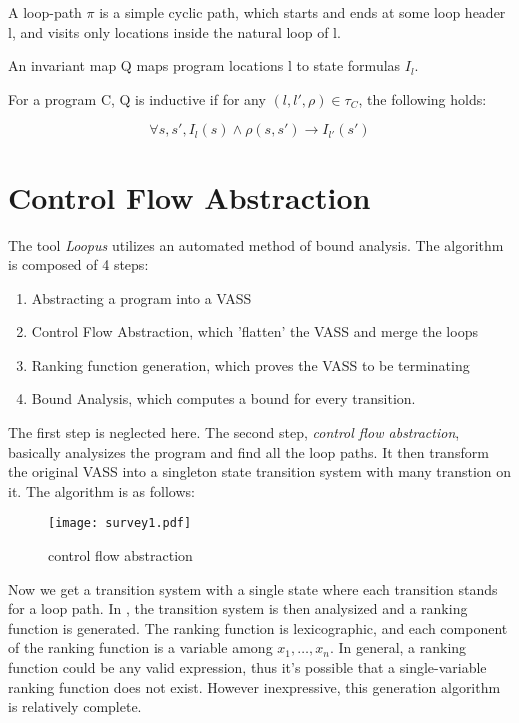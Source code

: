 \begin{survey}
\begin{definition}[Loop]
  A loop-path $\pi$ is a simple cyclic path, which starts and ends at some loop header l, and visits only locations inside the natural loop of l.
\end{definition}

\begin{definition}
  An invariant map Q maps program locations l to state formulas $I_l$.
  
  For a program C, Q is inductive if for any $(l, l', \rho) \in \tau_C$, the following holds: 
  
  \[ \forall s, s', I_l (s) \wedge \rho (s, s') \rightarrow I_{l'} (s') \]
  
\end{definition}

\section{Control Flow Abstraction}

The tool \textit{Loopus} {\cite{sinn_simple_2014, sinn_complexity_2017, sinn_difference_2015}} utilizes an automated method of bound analysis. The algorithm is composed of 4 steps:

\begin{enumerate}
  \item Abstracting a program into a VASS
  
  \item Control Flow Abstraction, which 'flatten' the VASS and merge the loops
  
  \item Ranking function generation, which proves the VASS to be terminating
  
  \item Bound Analysis, which computes a bound for every transition.
\end{enumerate}

The first step is neglected here. The second step, \textit{control flow abstraction}, basically analysizes the program and find all the loop paths. It then transform the original VASS into a singleton state transition system with many transtion on it. The algorithm is as follows:

\begin{figure}
    \centering
    \texttt{[image: survey1.pdf]}
    \caption{control flow abstraction}
\end{figure}

Now we get a transition system with a single state where each transition stands for a loop path. In {\cite{sinn_simple_2014}}, the transition system is then analysized and a ranking function is generated. The ranking function is lexicographic, and each component of the ranking function is a variable among $x_1, \ldots, x_n$. In general, a ranking function could be any valid expression, thus it's possible that a single-variable ranking function does not exist. However inexpressive, this generation algorithm is relatively complete.


\end{survey}
